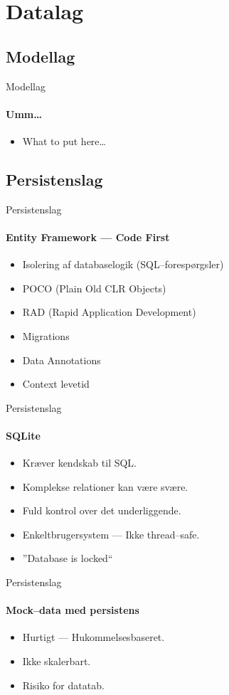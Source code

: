 \section{Datalag}



\subsection{Modellag}

\begin{frame}{Modellag}
  \framesubtitle{Umm\ldots}
  \begin{itemize}
    \item<1-> What to put here\ldots
  \end{itemize}
\end{frame}


\subsection{Persistenslag}

\begin{frame}{Persistenslag}
  \framesubtitle{Entity Framework --- Code First}
  \begin{itemize}
    \item<1-> \color{positivegreen}Isolering af databaselogik (SQL--forespørgsler)
    \item<1-> \color{positivegreen}POCO (Plain Old CLR Objects)
    \item<1-> \color{positivegreen}RAD (Rapid Application Development)
    \item<2-> \color{negativeyellow}Migrations
    \item<2-> \color{negativeyellow}Data Annotations
    \item<3-> \color{badred}Context levetid
  \end{itemize}
\end{frame}

\begin{frame}{Persistenslag}
  \framesubtitle{SQLite}
  \begin{itemize}
    \item<1-> \color{positivegreen}Kræver kendskab til SQL.
    \item<1-> \color{positivegreen}Komplekse relationer kan være svære.
    \item<1-> \color{positivegreen}Fuld kontrol over det underliggende.
    \item<2-> \color{negativeyellow}Enkeltbrugersystem --- Ikke thread--safe.
    \item<3-> \color{badred}''Database is locked``
  \end{itemize}
\end{frame}

\begin{frame}{Persistenslag}
  \framesubtitle{Mock--data med persistens}
  \begin{itemize}
    \item<1-> \color{positivegreen}Hurtigt --- Hukommelsesbaseret.
    \item<2-> \color{negativeyellow}Ikke skalerbart.
    \item<2-> \color{negativeyellow}Risiko for datatab.
  \end{itemize}
\end{frame}